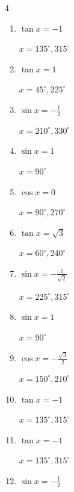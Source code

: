 \begin{multicols}{4}
\begin{enumerate}
        $\displaystyle x = 30^{\circ} , 210^{\circ}$

  \item $\displaystyle \tan{x}  = -1$

        $\displaystyle x = 135^{\circ} , 315^{\circ}$

  \item $\displaystyle \tan{x}  = 1$

        $\displaystyle x = 45^{\circ} , 225^{\circ}$

  \item $\displaystyle \sin{x}  = -\frac{1}{2}$

        $\displaystyle x = 210^{\circ} , 330^{\circ}$

\columnbreak %

  \item $\displaystyle \sin{x}  = 1$

        $\displaystyle x = 90^{\circ}$

  \item $\displaystyle \cos{x}  = 0$

        $\displaystyle x = 90^{\circ} , 270^{\circ}$

  \item $\displaystyle \tan{x}  = \sqrt{3}$

        $\displaystyle x = 60^{\circ} , 240^{\circ}$

  \item $\displaystyle \sin{x}  = -\frac{1}{\sqrt{2}}$

        $\displaystyle x = 225^{\circ} , 315^{\circ}$

  \item $\displaystyle \sin{x}  = 1$

        $\displaystyle x = 90^{\circ}$

  \item $\displaystyle \cos{x}  = -\frac{\sqrt{3}}{2}$

        $\displaystyle x = 150^{\circ} , 210^{\circ}$

  \item $\displaystyle \tan{x}  = -1$

        $\displaystyle x = 135^{\circ} , 315^{\circ}$

  \item $\displaystyle \tan{x}  = -1$

        $\displaystyle x = 135^{\circ} , 315^{\circ}$

  \item $\displaystyle \sin{x}  = -\frac{1}{2}$


\end{enumerate}
\end{multicols}
